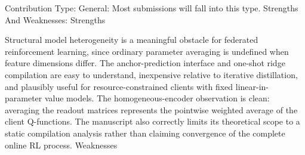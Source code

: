 Contribution Type: General: Most submissions will fall into this type.
Strengths And Weaknesses:
Strengths

Structural model heterogeneity is a meaningful obstacle for federated reinforcement learning, since ordinary parameter averaging is undefined when feature dimensions differ. The anchor-prediction interface and one-shot ridge compilation are easy to understand, inexpensive relative to iterative distillation, and plausibly useful for resource-constrained clients with fixed linear-in-parameter value models.
The homogeneous-encoder observation is clean: averaging the readout matrices represents the pointwise weighted average of the client Q-functions. The manuscript also correctly limits its theoretical scope to a static compilation analysis rather than claiming convergence of the complete online RL process.
Weaknesses

